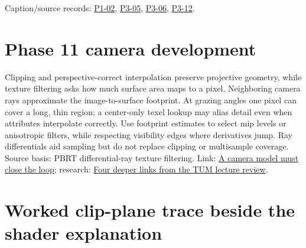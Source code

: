 Caption/source records: \href{Continuous\%20Notes/University\%20-\%20Worlds,\%20Images\%20and\%20Inference\%20-\%20Graphics,\%20Vision\%20and\%20Photography\#P1-02\%20-\%20Module\%201.2:\%20Course\%20Intro\%20&\%20Administrivia\%20Part\%202\%20Graphics\%20&\%20Visual\%20Computing\%202026}{P1-02}, \href{Continuous\%20Notes/University\%20-\%20Worlds,\%20Images\%20and\%20Inference\%20-\%20Graphics,\%20Vision\%20and\%20Photography\#P3-05\%20-\%20The\%20Camera\%20Transform}{P3-05}, \href{Continuous\%20Notes/University\%20-\%20Worlds,\%20Images\%20and\%20Inference\%20-\%20Graphics,\%20Vision\%20and\%20Photography\#P3-06\%20-\%20Clipping}{P3-06}, \href{Continuous\%20Notes/University\%20-\%20Worlds,\%20Images\%20and\%20Inference\%20-\%20Graphics,\%20Vision\%20and\%20Photography\#P3-12\%20-\%20Scan\%20Conversion}{P3-12}.

\section{Phase 11 camera development}\label{appendix-40426e4b2103-phase-11-camera-development}

Clipping and perspective-correct interpolation preserve projective geometry, while texture filtering asks how much surface area maps to a pixel. Neighboring camera rays approximate the image-to-surface footprint. At grazing angles one pixel can cover a long, thin region; a center-only texel lookup may alias detail even when attributes interpolate correctly. Use footprint estimates to select mip levels or anisotropic filters, while respecting visibility edges where derivatives jump. Ray differentials aid sampling but do not replace clipping or multisample coverage. Source basis: PBRT differential-ray texture filtering. Link: \href{Continuous\%20Notes/Computing\%20Foundations\%20-\%20From\%20Bits\%20to\%20C++\%20and\%20Systems\%20APIs\#A\%20camera\%20model\%20must\%20close\%20the\%20loop}{A camera model must close the loop}; research: \href{Continuous\%20Notes/Computing\%20Foundations\%20-\%20From\%20Bits\%20to\%20C++\%20and\%20Systems\%20APIs\#Four\%20deeper\%20links\%20from\%20the\%20TUM\%20lecture\%20review}{Four deeper links from the TUM lecture review}.

\section{Worked clip-plane trace beside the shader explanation}\label{appendix-40426e4b2103-worked-clip-plane-trace-beside-the-shader-explanation}

